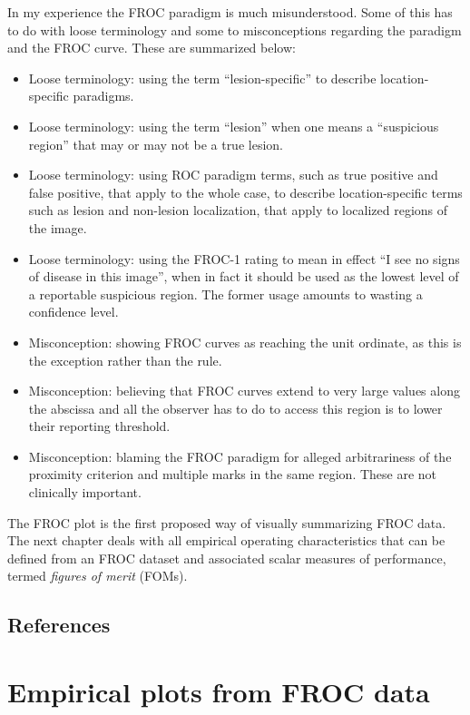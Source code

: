 \documentclass[
]{book}
\providecommand{\tightlist}{%
  \setlength{\itemsep}{0pt}\setlength{\parskip}{0pt}}
\begin{document}
In my experience the FROC paradigm is much misunderstood. Some of this has to do with loose terminology and some to misconceptions regarding the paradigm and the FROC curve. These are summarized below:

\begin{itemize}
\tightlist
\item
  Loose terminology: using the term ``lesion-specific'' to describe location-specific paradigms.
\item
  Loose terminology: using the term ``lesion'' when one means a ``suspicious region'' that may or may not be a true lesion.
\item
  Loose terminology: using ROC paradigm terms, such as true positive and false positive, that apply to the whole case, to describe location-specific terms such as lesion and non-lesion localization, that apply to localized regions of the image.
\item
  Loose terminology: using the FROC-1 rating to mean in effect ``I see no signs of disease in this image'', when in fact it should be used as the lowest level of a reportable suspicious region. The former usage amounts to wasting a confidence level.
\item
  Misconception: showing FROC curves as reaching the unit ordinate, as this is the exception rather than the rule.
\item
  Misconception: believing that FROC curves extend to very large values along the abscissa and all the observer has to do to access this region is to lower their reporting threshold.
\item
  Misconception: blaming the FROC paradigm for alleged arbitrariness of the proximity criterion and multiple marks in the same region. These are not clinically important.
\end{itemize}

The FROC plot is the first proposed way of visually summarizing FROC data. The next chapter deals with all empirical operating characteristics that can be defined from an FROC dataset and associated scalar measures of performance, termed \emph{figures of merit} (FOMs).

\hypertarget{froc-paradigm-references}{%
\section{References}\label{froc-paradigm-references}}

\hypertarget{froc-empirical}{%
\chapter{Empirical plots from FROC data}\label{froc-empirical}}
\end{document}
